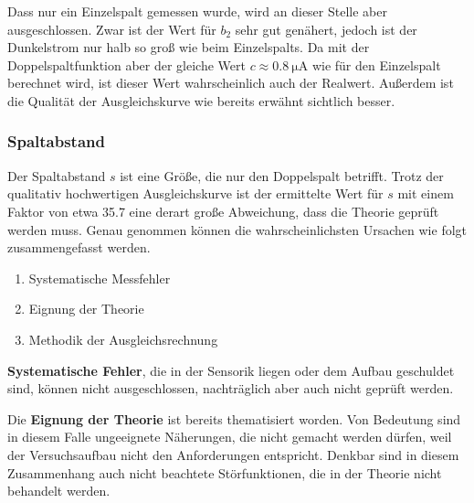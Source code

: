 Dass nur ein Einzelspalt gemessen wurde, wird an dieser Stelle aber ausgeschlossen. Zwar ist der Wert für $b_2$ sehr gut genähert, jedoch ist der Dunkelstrom nur halb so groß wie beim Einzelspalts.
Da mit der Doppelspaltfunktion aber der gleiche Wert $c \approx \SI{0.8}{\micro\ampere}$ wie für den Einzelspalt berechnet wird, ist dieser Wert wahrscheinlich auch der Realwert.
Außerdem ist die Qualität der Ausgleichskurve wie bereits erwähnt sichtlich besser. 

\subsubsection{Spaltabstand}
Der Spaltabstand $s$ ist eine Größe, die nur den Doppelspalt betrifft. Trotz der qualitativ hochwertigen Ausgleichskurve ist der ermittelte Wert für $s$ mit einem Faktor
von etwa 35.7 eine derart große Abweichung, dass die Theorie geprüft werden muss.
Genau genommen können die wahrscheinlichsten Ursachen wie folgt zusammengefasst werden.
\begin{enumerate}
    \item Systematische Messfehler
    \item Eignung der Theorie
    \item Methodik der Ausgleichsrechnung
\end{enumerate}
\textbf{Systematische Fehler}, die in der Sensorik liegen oder dem Aufbau geschuldet sind, können nicht ausgeschlossen, nachträglich aber auch nicht geprüft werden.

Die \textbf{Eignung der Theorie} ist bereits thematisiert worden. Von Bedeutung sind in diesem Falle ungeeignete Näherungen, die nicht gemacht werden dürfen, weil der Versuchsaufbau nicht
den Anforderungen entspricht. Denkbar sind in diesem Zusammenhang auch nicht beachtete Störfunktionen, die in der Theorie nicht behandelt werden.

